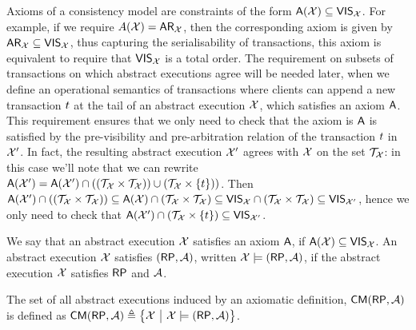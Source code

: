 Axioms of a consistency model are constraints of the form $\mathsf{A}(\mathcal{X}) \subseteq \mathsf{VIS}_{\mathcal{X}}$. 
For example, if we require $A(\mathcal{X}) = \mathsf{AR}_{\mathcal{X}}$, 
then the corresponding axiom is given by $\mathsf{AR}_{\mathcal{X}} \subseteq \mathsf{VIS}_{\mathcal{X}}$,
thus capturing the serialisability of transactions,
\ie this axiom is equivalent to require that $\mathsf{VIS}_{\mathcal{X}}$ is a total order.
The requirement on subsets of transactions on which 
abstract executions agree will be needed later, 
when we define an operational semantics of transactions where 
clients can append a new transaction $t$ at the tail of an abstract execution $\mathcal{X}$,
which satisfies an axiom $\mathsf{A}$. This requirement ensures that 
we only need to check that the axiom is $\mathsf{A}$ is satisfied by the pre-visibility 
and pre-arbitration relation of the transaction $t$ in $\mathcal{X}'$. 
In fact, the resulting abstract execution $\mathcal{X}'$ agrees with $\mathcal{X}$ on the set $\mathcal{T}_{\mathcal{X}}$: 
in this case we'll note that we can rewrite 
$\mathsf{A}(\mathcal{X}') = \mathsf{A}(\mathcal{X}') \cap ((\mathcal{T}_{\mathcal{X}} \times \mathcal{T}_{\mathcal{X}}) ) \cup (\mathcal{T}_{\mathcal{X}} \times \{t\}))$.
Then
$\mathsf{A}(\mathcal{X}') \cap ((\mathcal{T}_{\mathcal{X}} \times \mathcal{T}_{\mathcal{X}})) \subseteq \mathsf{A}(\mathcal{X}) \cap (\mathcal{T}_{\mathcal{X}} \times \mathcal{T}_{\mathcal{X}}) \subseteq \mathsf{VIS}_{\mathcal{X}} \cap (\mathcal{T}_{\mathcal{X}} \times \mathcal{T}_{\mathcal{X}}) \subseteq \mathsf{VIS}_{\mathcal{X}'}$, 
hence we only need to check that $\mathsf{A}(\mathcal{X}') \cap (\mathcal{T}_{\mathcal{X}} \times \{t\}) \subseteq \mathsf{VIS}_{\mathcal{X}'}$.

We say that an abstract execution $\mathcal{X}$ satisfies an axiom $\mathsf{A}$, 
if $\mathsf{A}(\mathcal{X}) \subseteq \mathsf{VIS}_{\mathcal{X}}$. 
An abstract execution $\mathcal{X}$ satisfies $(\RP,\Ax)$, written $\aexec \models (\RP,\Ax)$,  
if the abstract execution \( \mathcal{X} \) satisfies \( \RP \) and \( \mathcal{A} \).

\begin{definition}
\label{def:axiom-to-aexec}
The set of all abstract executions induced by an axiomatic definition, \( \CMa(\RP,\Ax)\) is defined as \( \CMa(\RP,\Ax) \defeq \Setcon{\aexec}{\aexec \models (\RP,\Ax)}\).
\end{definition}


